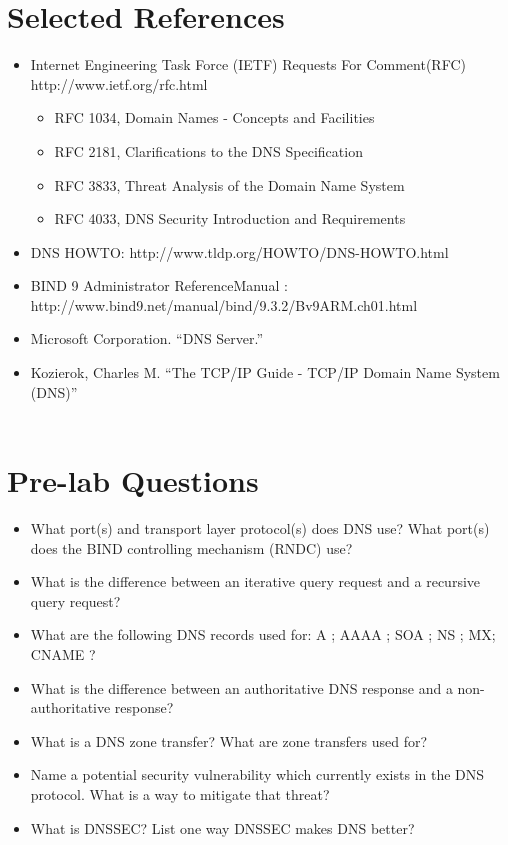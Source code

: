 \documentclass{article}
\begin{document}
\section{Selected References}
\begin{itemize}
\item Internet Engineering Task Force (IETF) Requests For Comment(RFC)  http://www.ietf.org/rfc.html
\begin{itemize}
	\item RFC 1034, Domain Names - Concepts and Facilities
	\item RFC 2181, Clarifications to the DNS Specification
	\item RFC 3833, Threat Analysis of the Domain Name System
	\item RFC 4033, DNS Security Introduction and Requirements

\end{itemize} 
\item DNS HOWTO: 
\newblock http://www.tldp.org/HOWTO/DNS-HOWTO.html
\item BIND 9 Administrator ReferenceManual :
\newblock http://www.bind9.net/manual/bind/9.3.2/Bv9ARM.ch01.html

\item Microsoft Corporation. ``DNS Server.'' 

\item Kozierok, Charles M.  ``The TCP/IP Guide - TCP/IP Domain Name System (DNS)''\\ \\
\end{itemize}
\section{Pre-lab Questions}
\begin{itemize}
\item \question What port(s) and transport layer protocol(s) does DNS use? What port(s) does the BIND controlling mechanism (RNDC) use?
\item \question What is the difference between an iterative query request and a recursive query request?
\item \question What are the following DNS records used for: A ; AAAA ; SOA ; NS ; MX; CNAME ?
\item \question What is the difference between an authoritative DNS response and a non-authoritative response?
\item \question What is a DNS zone transfer? What are zone transfers used for?
\item \question Name a potential security vulnerability which currently exists in the DNS protocol. What is a way to mitigate that threat?
\item \question What is DNSSEC? List one way DNSSEC makes DNS better?
\end{itemize}
\end{document}
